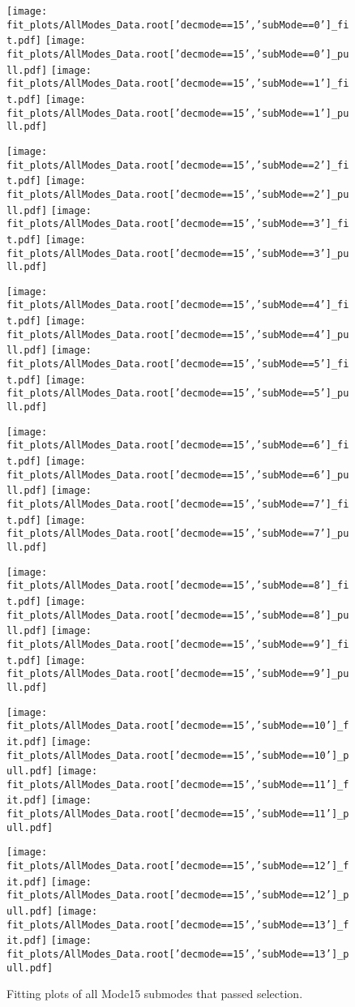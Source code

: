 \begin{figure}[h!]
\begin{center}
\texttt{[image: fit\_plots/AllModes\_Data.root['decmode==15','subMode==0']\_fit.pdf]}
\texttt{[image: fit\_plots/AllModes\_Data.root['decmode==15','subMode==0']\_pull.pdf]}
\texttt{[image: fit\_plots/AllModes\_Data.root['decmode==15','subMode==1']\_fit.pdf]}
\texttt{[image: fit\_plots/AllModes\_Data.root['decmode==15','subMode==1']\_pull.pdf]}

\texttt{[image: fit\_plots/AllModes\_Data.root['decmode==15','subMode==2']\_fit.pdf]}
\texttt{[image: fit\_plots/AllModes\_Data.root['decmode==15','subMode==2']\_pull.pdf]}
\texttt{[image: fit\_plots/AllModes\_Data.root['decmode==15','subMode==3']\_fit.pdf]}
\texttt{[image: fit\_plots/AllModes\_Data.root['decmode==15','subMode==3']\_pull.pdf]}

\texttt{[image: fit\_plots/AllModes\_Data.root['decmode==15','subMode==4']\_fit.pdf]}
\texttt{[image: fit\_plots/AllModes\_Data.root['decmode==15','subMode==4']\_pull.pdf]}
\texttt{[image: fit\_plots/AllModes\_Data.root['decmode==15','subMode==5']\_fit.pdf]}
\texttt{[image: fit\_plots/AllModes\_Data.root['decmode==15','subMode==5']\_pull.pdf]}

\texttt{[image: fit\_plots/AllModes\_Data.root['decmode==15','subMode==6']\_fit.pdf]}
\texttt{[image: fit\_plots/AllModes\_Data.root['decmode==15','subMode==6']\_pull.pdf]}
\texttt{[image: fit\_plots/AllModes\_Data.root['decmode==15','subMode==7']\_fit.pdf]}
\texttt{[image: fit\_plots/AllModes\_Data.root['decmode==15','subMode==7']\_pull.pdf]}

\texttt{[image: fit\_plots/AllModes\_Data.root['decmode==15','subMode==8']\_fit.pdf]}
\texttt{[image: fit\_plots/AllModes\_Data.root['decmode==15','subMode==8']\_pull.pdf]}
\texttt{[image: fit\_plots/AllModes\_Data.root['decmode==15','subMode==9']\_fit.pdf]}
\texttt{[image: fit\_plots/AllModes\_Data.root['decmode==15','subMode==9']\_pull.pdf]}

\texttt{[image: fit\_plots/AllModes\_Data.root['decmode==15','subMode==10']\_fit.pdf]}
\texttt{[image: fit\_plots/AllModes\_Data.root['decmode==15','subMode==10']\_pull.pdf]}
\texttt{[image: fit\_plots/AllModes\_Data.root['decmode==15','subMode==11']\_fit.pdf]}
\texttt{[image: fit\_plots/AllModes\_Data.root['decmode==15','subMode==11']\_pull.pdf]}

\texttt{[image: fit\_plots/AllModes\_Data.root['decmode==15','subMode==12']\_fit.pdf]}
\texttt{[image: fit\_plots/AllModes\_Data.root['decmode==15','subMode==12']\_pull.pdf]}
\texttt{[image: fit\_plots/AllModes\_Data.root['decmode==15','subMode==13']\_fit.pdf]}
\texttt{[image: fit\_plots/AllModes\_Data.root['decmode==15','subMode==13']\_pull.pdf]}
\caption{Fitting plots of all Mode15 submodes that passed selection.}
\label{fig:passMode03}
\end{center}
\end{figure}
